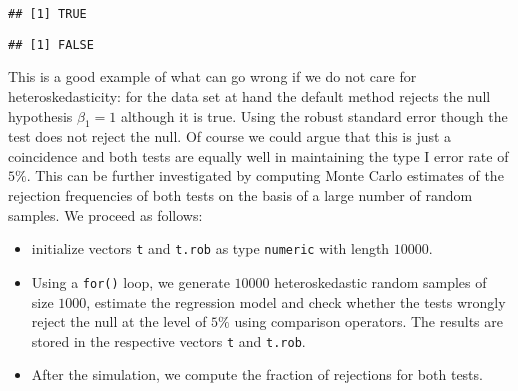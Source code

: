 \documentclass[]{book}
\newenvironment{Shaded}{\begin{snugshade}}{\end{snugshade}}
\newcommand{\KeywordTok}[1]{\textcolor[rgb]{0.13,0.29,0.53}{\textbf{#1}}}
\newcommand{\DataTypeTok}[1]{\textcolor[rgb]{0.13,0.29,0.53}{#1}}
\newcommand{\DecValTok}[1]{\textcolor[rgb]{0.00,0.00,0.81}{#1}}
\newcommand{\FloatTok}[1]{\textcolor[rgb]{0.00,0.00,0.81}{#1}}
\newcommand{\StringTok}[1]{\textcolor[rgb]{0.31,0.60,0.02}{#1}}
\newcommand{\CommentTok}[1]{\textcolor[rgb]{0.56,0.35,0.01}{\textit{#1}}}
\newcommand{\OperatorTok}[1]{\textcolor[rgb]{0.81,0.36,0.00}{\textbf{#1}}}
\newcommand{\NormalTok}[1]{#1}
\providecommand{\tightlist}{%
  \setlength{\itemsep}{0pt}\setlength{\parskip}{0pt}}
\theoremstyle{definition}
\theoremstyle{definition}
\theoremstyle{definition}
\theoremstyle{remark}
\begin{document}
\begin{Shaded}
\end{Shaded}

\begin{verbatim}
## [1] TRUE
\end{verbatim}

\begin{Shaded}
\end{Shaded}

\begin{verbatim}
## [1] FALSE
\end{verbatim}

This is a good example of what can go wrong if we do not care for
heteroskedasticity: for the data set at hand the default method rejects
the null hypothesis \(\beta_1 = 1\) although it is true. Using the
robust standard error though the test does not reject the null. Of
course we could argue that this is just a coincidence and both tests are
equally well in maintaining the type I error rate of \(5\%\). This can
be further investigated by computing Monte Carlo estimates of the
rejection frequencies of both tests on the basis of a large number of
random samples. We proceed as follows:

\begin{itemize}
\tightlist
\item
  initialize vectors \texttt{t} and \texttt{t.rob} as type
  \texttt{numeric} with length \(10000\).
\item
  Using a \texttt{for()} loop, we generate \(10000\) heteroskedastic
  random samples of size \(1000\), estimate the regression model and
  check whether the tests wrongly reject the null at the level of
  \(5\%\) using comparison operators. The results are stored in the
  respective vectors \texttt{t} and \texttt{t.rob}.
\item
  After the simulation, we compute the fraction of rejections for both
  tests.
\end{itemize}
\end{document}
